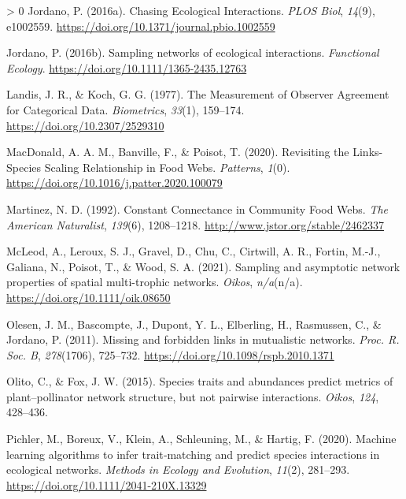 \documentclass[10pt,oneside]{article}
\newlength{\cslhangindent}
\newenvironment{CSLReferences}[3] %
 {%
  \setlength{\parindent}{0pt}
  \ifodd #1 \everypar{\setlength{\hangindent}{\cslhangindent}}\ignorespaces\fi
  \ifnum #2 > 0
  \setlength{\parskip}{#2\baselineskip}
  \fi
 }%
 {}
\begin{document}
\begin{CSLReferences}{1}{0}
\leavevmode\hypertarget{ref-Jordano2016ChaEco}{}%
Jordano, P. (2016a). Chasing Ecological Interactions. \emph{PLOS Biol},
\emph{14}(9), e1002559.
\url{https://doi.org/10.1371/journal.pbio.1002559}

\leavevmode\hypertarget{ref-Jordano2016SamNet}{}%
Jordano, P. (2016b). Sampling networks of ecological interactions.
\emph{Functional Ecology}. \url{https://doi.org/10.1111/1365-2435.12763}

\leavevmode\hypertarget{ref-Landis1977MeaObs}{}%
Landis, J. R., \& Koch, G. G. (1977). The Measurement of Observer
Agreement for Categorical Data. \emph{Biometrics}, \emph{33}(1),
159--174. \url{https://doi.org/10.2307/2529310}

\leavevmode\hypertarget{ref-MacDonald2020RevLin}{}%
MacDonald, A. A. M., Banville, F., \& Poisot, T. (2020). Revisiting the
Links-Species Scaling Relationship in Food Webs. \emph{Patterns},
\emph{1}(0). \url{https://doi.org/10.1016/j.patter.2020.100079}

\leavevmode\hypertarget{ref-Martinez1992ConCon}{}%
Martinez, N. D. (1992). Constant Connectance in Community Food Webs.
\emph{The American Naturalist}, \emph{139}(6), 1208--1218.
\url{http://www.jstor.org/stable/2462337}

\leavevmode\hypertarget{ref-McLeod2021SamAsy}{}%
McLeod, A., Leroux, S. J., Gravel, D., Chu, C., Cirtwill, A. R., Fortin,
M.-J., Galiana, N., Poisot, T., \& Wood, S. A. (2021). Sampling and
asymptotic network properties of spatial multi-trophic networks.
\emph{Oikos}, \emph{n/a}(n/a). \url{https://doi.org/10.1111/oik.08650}

\leavevmode\hypertarget{ref-Olesen2011MisFor}{}%
Olesen, J. M., Bascompte, J., Dupont, Y. L., Elberling, H., Rasmussen,
C., \& Jordano, P. (2011). Missing and forbidden links in mutualistic
networks. \emph{Proc. R. Soc. B}, \emph{278}(1706), 725--732.
\url{https://doi.org/10.1098/rspb.2010.1371}

\leavevmode\hypertarget{ref-Olito2015SpeTra}{}%
Olito, C., \& Fox, J. W. (2015). Species traits and abundances predict
metrics of plant--pollinator network structure, but not pairwise
interactions. \emph{Oikos}, \emph{124}, 428--436.

\leavevmode\hypertarget{ref-Pichler2020MacLea}{}%
Pichler, M., Boreux, V., Klein, A., Schleuning, M., \& Hartig, F.
(2020). Machine learning algorithms to infer trait‐matching and predict
species interactions in ecological networks. \emph{Methods in Ecology
and Evolution}, \emph{11}(2), 281--293.
\url{https://doi.org/10.1111/2041-210X.13329}


\end{CSLReferences}
\end{document}
